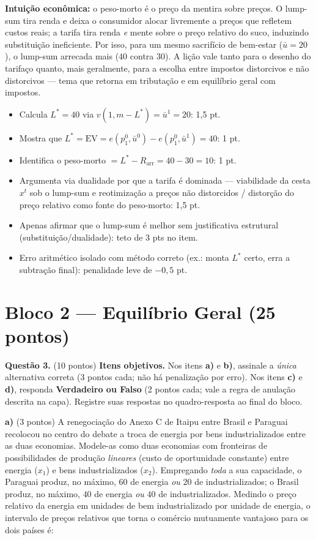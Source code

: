 \begin{solucao}
\textbf{Intuição econômica:} o peso-morto é o preço da mentira sobre preços. O lump-sum tira renda e deixa o consumidor alocar livremente a preços que refletem custos reais; a tarifa tira renda \emph{e} mente sobre o preço relativo do suco, induzindo substituição ineficiente. Por isso, para um mesmo sacrifício de bem-estar ($\bar u=20$), o lump-sum arrecada mais ($40$ contra $30$). A lição vale tanto para o desenho do tarifaço quanto, mais geralmente, para a escolha entre impostos distorcivos e não distorcivos --- tema que retorna em tributação e em equilíbrio geral com impostos.
\rubricalabel
\begin{itemize}
\item Calcula $L^{*}=40$ via $v(1,m-L^{*})=\bar u^{1}=20$: 1{,}5 pt.
\item Mostra que $L^{*}=\mathrm{EV}=e(p_1^{0},\bar u^{0})-e(p_1^{0},\bar u^{1})=40$: 1 pt.
\item Identifica o peso-morto $=L^{*}-R_{\text{arr}}=40-30=10$: 1 pt.
\item Argumenta via dualidade por que a tarifa é dominada --- viabilidade da cesta $x^{t}$ sob o lump-sum e reotimização a preços não distorcidos / distorção do preço relativo como fonte do peso-morto: 1{,}5 pt.
\item Apenas afirmar que o lump-sum é melhor sem justificativa estrutural (substituição/dualidade): teto de 3 pts no item.
\item Erro aritmético isolado com método correto (ex.: monta $L^{*}$ certo, erra a subtração final): penalidade leve de $-0{,}5$ pt.
\end{itemize}
\end{solucao}



\section*{Bloco 2 --- Equilíbrio Geral \hfill \normalsize (25 pontos)}

\textbf{Questão 3.} (10 pontos) \textbf{Itens objetivos.} Nos itens \textbf{a)} e \textbf{b)}, assinale a \emph{única} alternativa correta (3 pontos cada; não há penalização por erro). Nos itens \textbf{c)} e \textbf{d)}, responda \textbf{Verdadeiro ou Falso} (2 pontos cada; vale a regra de anulação descrita na capa). Registre suas respostas no quadro-resposta ao final do bloco.

\textbf{a)} (3 pontos) A renegociação do Anexo C de Itaipu entre Brasil e Paraguai recolocou no centro do debate a troca de energia por bens industrializados entre as duas economias. Modele-as como duas economias com fronteiras de possibilidades de produção \emph{lineares} (custo de oportunidade constante) entre energia ($x_1$) e bens industrializados ($x_2$). Empregando \emph{toda} a sua capacidade, o Paraguai produz, no máximo, $60$ de energia \emph{ou} $20$ de industrializados; o Brasil produz, no máximo, $40$ de energia \emph{ou} $40$ de industrializados. Medindo o preço relativo da energia em unidades de bem industrializado por unidade de energia, o intervalo de preços relativos que torna o comércio mutuamente vantajoso para os dois países é:


